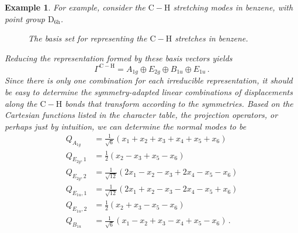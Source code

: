 \documentclass{article}
\theoremstyle{plain}\theoremheaderfont{\normalfont\itshape}\theorembodyfont{\rmfamily}\theoremseparator{.}\newtheorem*{rem}{Remark}\newtheorem*{ex}{Example}\newtheorem*{proof}{Proof}\newtheorem*{altp}{Alternative proof}
\theoremstyle{plain}\theoremheaderfont{\normalfont\bfseries}\theorembodyfont{\rmfamily}\theoremseparator{.}\newtheorem{thm}{Theorem}[section]\newtheorem{lem}[thm]{Lemma}\newtheorem{prop}[thm]{Proposition}\newtheorem*{cor}{Corollary}\newtheorem{defn}[thm]{Definition}\newtheorem{clm}[thm]{Claim}\newtheorem{clminproof}{Claim}
\theoremstyle{break}\theoremheaderfont{\normalfont\itshape}\theorembodyfont{\rmfamily}\theoremseparator{.\medskip}\newtheorem*{proofskip}{Proof}\newtheorem*{exs}{Examples}\newtheorem*{rems}{Remarks}
\theoremstyle{break}\theoremheaderfont{\normalfont\bfseries}\theorembodyfont{\rmfamily}\theoremseparator{.\medskip}\newtheorem{lemskip}[thm]{Lemma}\newtheorem{defnskip}[thm]{Definition}\newtheorem{propskip}[thm]{Proposition}\newtheorem{thmskip}[thm]{Theorem}
\numberwithin{equation}{section}
\begin{document}
    \begin{ex}
        For example, consider the \(\mathrm{C-H}\) stretching modes in benzene, with point group \(\mathrm{D_{6h}}\).
        \begin{figure}[ht!]
            \centering
            \caption{The basis set for representing the \(\mathrm{C-H}\) stretches in benzene.}
        \end{figure}

        Reducing the representation formed by these basis vectors yields
        \begin{equation}
            \Gamma^{\mathrm{C-H}}=A_{1g}\oplus E_{2g}\oplus B_{1u}\oplus E_{1u}\,.
        \end{equation}
        Since there is only one combination for each irreducible representation, it should be easy to determine the symmetry-adapted linear combinations of displacements along the \(\mathrm{C-H}\) bonds that transform according to the symmetries. Based on the Cartesian functions listed in the character table, the projection operators, or perhaps just by intuition, we can determine the normal modes to be
        \begin{align}
            Q_{A_{1g}}&=\frac{1}{\sqrt{6}}(x_1+x_2+x_3+x_4+x_5+x_6)\\
            Q_{E_{2g},1}&=\frac{1}{2}(x_2-x_3+x_5-x_6)\\
            Q_{E_{2g},2}&=\frac{1}{\sqrt{12}}(2x_1-x_2-x_3+2x_4-x_5-x_6)\\
            Q_{E_{1u},1}&=\frac{1}{\sqrt{12}}(2x_1+x_2-x_3-2x_4-x_5+x_6)\\
            Q_{E_{1u},2}&=\frac{1}{2}(x_2+x_3-x_5-x_6)\\
            Q_{B_{1u}}&=\frac{1}{\sqrt{6}}(x_1-x_2+x_3-x_4+x_5-x_6)\,.
        \end{align}
    \end{ex}
\end{document}
